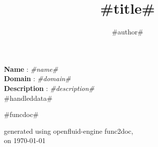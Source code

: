 \documentclass[a4paper,10pt]{article}
\title{#title#}
\author{#author#}
\date{}
\begin{document}
\maketitle

\noindent \textbf{Name} : \textit{#name#}\\
\noindent \textbf{Domain} : \textit{#domain#}\\
\noindent \textbf{Description} : \textit{#description#}\\

#handleddata#

\bigskip
\bigskip

\begin{multicols}{2}

#funcdoc#

\end{multicols}

\bigskip
\bigskip
\small
\begin{flushright}generated using openfluid-engine func2doc,\\
on \today\end{flushright}
\small
\end{document}
